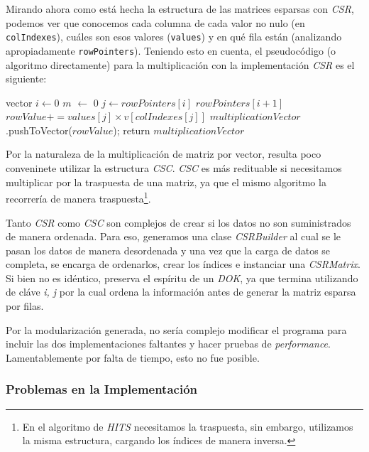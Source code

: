 Mirando ahora como está hecha la estructura de las matrices esparsas con \textit{CSR}, podemos ver que conocemos cada columna de cada valor no nulo (en \texttt{colIndexes}), cuáles son esos valores (\texttt{values}) y en qué fila están (analizando apropiadamente \texttt{rowPointers}). Teniendo esto en cuenta, el pseudocódigo (o algoritmo directamente) para la multiplicación con la implementación \textit{CSR} es el siguiente:

	\vspace{\baselineskip}
	\begin{codebox}
	\li vector 
	\li \For $i \gets 0$ \To $m$ \Do
	\li {} $\gets$ 0
	\li \For $j \gets rowPointers[i]$ \To $rowPointers[i+1]$ \Do
	\li $rowValue += values[j] \times v[colIndexes[j]]$  \End 
	\li
	\li $multiplicationVector$.pushToVector($rowValue$); \End
	\li 
	\li return $multiplicationVector$
	\End
	\end{codebox} 
	\vspace{\baselineskip}

\par	
Por la naturaleza de la multiplicación de matriz por vector, resulta poco conveninete utilizar la estructura \textit{CSC}. \textit{CSC} es más redituable si necesitamos multiplicar por la traspuesta de una matriz, ya que el mismo algoritmo la recorrería de manera traspuesta\footnote{En el algoritmo de \textit{HITS} necesitamos la traspuesta, sin embargo, utilizamos la misma estructura, cargando los índices de manera inversa.}.

	Tanto \textit{CSR} como \textit{CSC} son complejos de crear si los datos no son suministrados de manera ordenada. Para eso, generamos una clase \textit{CSRBuilder} al cual se le pasan los datos de manera desordenada y una vez que la carga de datos se completa, se encarga de ordenarlos, crear los índices e instanciar una \textit{CSRMatrix}. Si bien no es idéntico, preserva el espíritu de un \textit{DOK}, ya que termina utilizando de cláve \textit{i, j} por la cual ordena la información antes de generar la matriz esparsa por filas. 

	Por la modularización generada, no sería complejo modificar el programa para incluir las dos implementaciones faltantes y hacer pruebas de \textit{performance}. Lamentablemente por falta de tiempo, esto no fue posible.

\subsubsection{Problemas en la Implementación}

